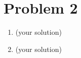 \documentclass[12pt]{article}
\begin{document}
\section*{Problem 2}

\begin{enumerate}[label=(\alph*)]
  \item (your solution)
  \item (your solution)
\end{enumerate}
\end{document}
